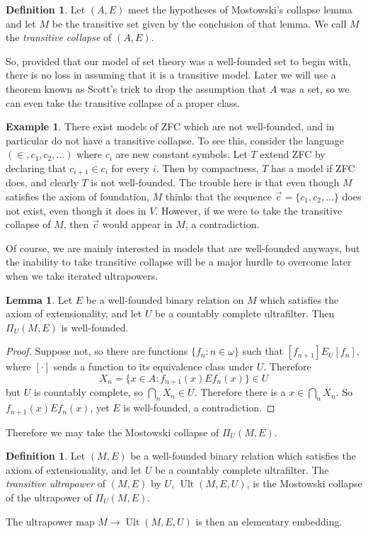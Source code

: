 \documentclass[12pt]{report}
\DeclareMathOperator{\Ult}{Ult}
\newcommand{\dfn}[1]{\emph{#1}\index{#1}}
\theoremstyle{definition}
\newtheorem{lemma}[theorem]{Lemma}
\newtheorem{definition}[theorem]{Definition}
\newtheorem{example}[theorem]{Example}
\begin{document}
\begin{definition}
Let $(A, E)$ meet the hypotheses of Mostowski's collapse lemma and let $M$ be the transitive set given by the conclusion of that lemma. We call $M$ the \dfn{transitive collapse} of $(A, E)$.
\end{definition}
So, provided that our model of set theory was a well-founded set to begin with, there is no loss in assuming that it is a transitive model. Later we will use a theorem known as Scott's trick to drop the assumption that $A$ was a set, so we can even take the transitive collapse of a proper class.

\begin{example}
There exist models of ZFC which are not well-founded, and in particular do not have a transitive collapse.
To see this, consider the language $(\in, c_1, c_2, \dots)$ where $c_i$ are new constant symbols.
Let $T$ extend ZFC by declaring that $c_{i+1} \in c_i$ for every $i$. Then by compactness, $T$ has a model if ZFC does, and clearly $T$ is not well-founded.
The trouble here is that even though $M$ satisfies the axiom of foundation, $M$ thinks that the sequence $\vec c = \{c_1, c_2, \dots\}$ does not exist, even though it does in $V$.
However, if we were to take the transitive collapse of $M$, then $\vec c$ would appear in $M$, a contradiction.
\end{example}

Of course, we are mainly interested in models that are well-founded anyways, but the inability to take transitive collapse will be a major hurdle to overcome later when we take iterated ultrapowers.

\begin{lemma}
Let $E$ be a well-founded binary relation on $M$ which satisfies the axiom of extensionality, and let $U$ be a countably complete ultrafilter. Then $\Pi_U(M, E)$ is well-founded.
\end{lemma}
\begin{proof}
Suppose not, so there are functions $\{f_n: n \in \omega\}$ such that $[f_{n+1}] E_U [f_n]$, where $[\cdot]$ sends a function to its equivalence class under $U$. Therefore
$$X_n = \{x \in A: f_{n+1}(x) E f_n(x)\} \in U$$
but $U$ is countably complete, so $\bigcap_n X_n \in U$. Therefore there is a $x \in \bigcap_n X_n$.
So $f_{n+1}(x)Ef_n(x)$, yet $E$ is well-founded, a contradiction.
\end{proof}
Therefore we may take the Mostowski collapse of $\Pi_U(M, E)$.
\begin{definition}
Let $(M, E)$ be a well-founded binary relation which satisfies the axiom of extensionality, and let $U$ be a countably complete ultrafilter. The \dfn{transitive ultrapower} of $(M, E)$ by $U$, $\Ult(M, E, U)$, is the Mostowski collapse of the ultrapower of $\Pi_U(M, E)$.
\end{definition}
The ultrapower map $M \to \Ult(M, E, U)$ is then an elementary embedding.
\end{document}
